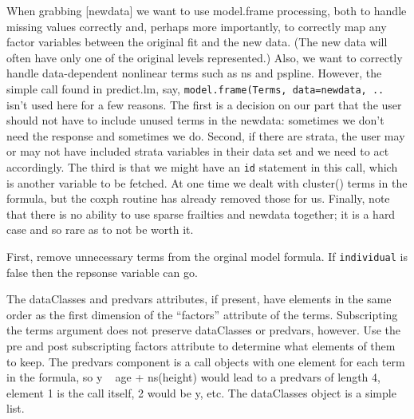 \documentclass{article}
\newcommand{\code}[1]{\texttt{#1}}
\begin{document}
When grabbing [newdata] we want to use model.frame processing, both to 
handle missing values correctly and, perhaps more importantly, to correctly
map any factor variables between the original fit and the new data.  (The
new data will often have only one of the original levels represented.)
Also, we want to correctly handle data-dependent nonlinear terms such as
ns and pspline.
However, the simple call found in predict.lm, say,
\code{model.frame(Terms, data=newdata, ..} isn't used here
for a few reasons. 
The first is a decision on our part that the user should not have
to include unused terms in the newdata: sometimes we don't need the
response and sometimes we do.  
Second, if there are strata, the user may or may not
have included strata variables in their data set and we need to
act accordingly.
The third is that we might have an \code{id} statement in this
call, which is another variable to be fetched.
At one time we dealt with cluster() terms in the formula, but the coxph
routine has already removed those for us.
Finally, note that there is no ability to use sparse frailties and newdata together;
it is a hard case and so rare as to not be worth it.

First, remove unnecessary terms from the orginal model formula. 
If \code{individual} is false then the repsonse variable can go.

The dataClasses and predvars attributes, if present, have elements
in the same order as the first dimension of the ``factors'' attribute
of the terms.
Subscripting the terms argument does not preserve dataClasses or 
predvars, however.  Use the pre and post subscripting factors attribute
to determine what elements of them to keep.
The predvars component is a call objects with one element for each
term in the formula, so y ~ age + ns(height) would lead to a predvars
of length 4, element 1 is the call itself, 2 would be y, etc.
The dataClasses object is a simple list.
\end{document}
